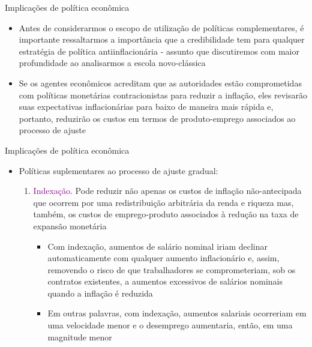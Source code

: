 \documentclass[10pt]{beamer}
\begin{document}
\begin{frame}{Implicações de política econômica}
    \begin{itemize}
        \item Antes de considerarmos o escopo de utilização de políticas complementares, é importante ressaltarmos a importância que a credibilidade tem para qualquer estratégia de política antiinflacionária - assunto que discutiremos com maior profundidade ao analisarmos a escola novo-clássica
        \bigskip
        \item Se os agentes econômicos acreditam que as autoridades estão comprometidas com políticas monetárias contracionistas para reduzir a inflação, eles revisarão suas expectativas inflacionárias para baixo de maneira mais rápida e, portanto, reduzirão os custos em termos de produto-emprego associados ao processo de ajuste
    \end{itemize}    
\end{frame}

\begin{frame}{Implicações de política econômica}
    \begin{itemize}
        \item Políticas suplementares ao processo de ajuste gradual:
        \bigskip
        \begin{enumerate}
            \item \textcolor{purple}{Indexação}. Pode reduzir não apenas os custos de inflação não-antecipada que ocorrem por uma redistribuição arbitrária da renda e riqueza mas, também, os custos de emprego-produto associados à redução na taxa de expansão monetária
            \bigskip
            \begin{itemize}
                \item Com indexação, aumentos de salário nominal iriam declinar automaticamente com qualquer aumento inflacionário e, assim, removendo o risco de que trabalhadores se comprometeriam, sob os contratos existentes, a aumentos excessivos de salários nominais quando a inflação é reduzida
                \bigskip
                \item Em outras palavras, com indexação, aumentos salariais ocorreriam em uma velocidade menor e o desemprego aumentaria, então, em uma magnitude menor
            \end{itemize}
        \end{enumerate}
    \end{itemize}    
\end{frame}
\end{document}
